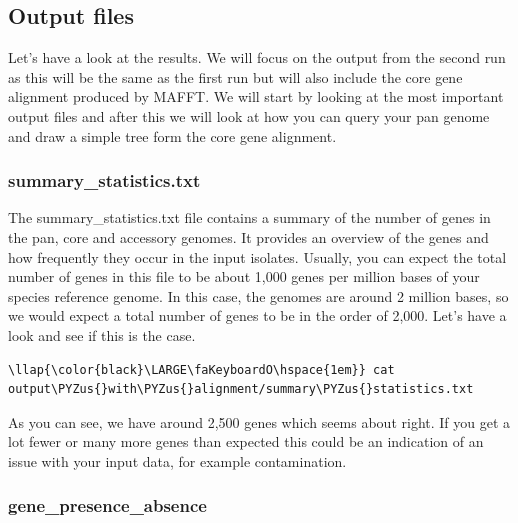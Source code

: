 \documentclass[11pt]{article}
\def\PYZus{\char`\_}
\begin{document}
\hypertarget{output-files}{%
\subsection{Output files}\label{output-files}}

Let's have a look at the results. We will focus on the output from the
second run as this will be the same as the first run but will also
include the core gene alignment produced by MAFFT. We will start by
looking at the most important output files and after this we will look
at how you can query your pan genome and draw a simple tree form the
core gene alignment.

\hypertarget{summary_statistics.txt}{%
\subsubsection{summary\_statistics.txt}\label{summary_statistics.txt}}

The summary\_statistics.txt file contains a summary of the number of
genes in the pan, core and accessory genomes. It provides an overview of
the genes and how frequently they occur in the input isolates. Usually,
you can expect the total number of genes in this file to be about 1,000
genes per million bases of your species reference genome. In this case,
the genomes are around 2 million bases, so we would expect a total
number of genes to be in the order of 2,000. Let's have a look and see
if this is the case.

\begin{terminalinput}
\begin{Verbatim}[commandchars=\\\{\}]
\llap{\color{black}\LARGE\faKeyboardO\hspace{1em}} cat output\PYZus{}with\PYZus{}alignment/summary\PYZus{}statistics.txt
\end{Verbatim}
\end{terminalinput}

    As you can see, we have around 2,500 genes which seems about right. If
you get a lot fewer or many more genes than expected this could be an
indication of an issue with your input data, for example contamination.

\hypertarget{gene_presence_absence}{%
\subsubsection{gene\_presence\_absence}\label{gene_presence_absence}}
\end{document}
